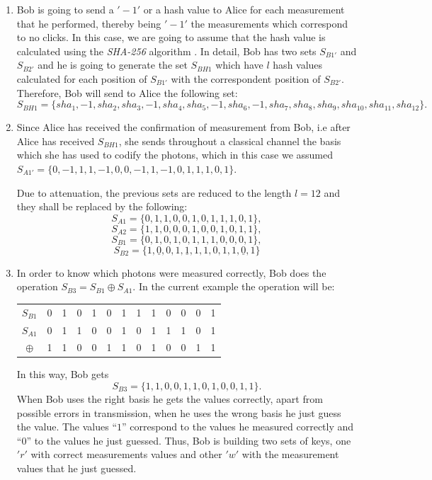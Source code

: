 \begin{enumerate}
  \item Bob is going to send a $'-1'$ or a hash value to Alice for each measurement that he performed, thereby being $'-1'$ the measurements which correspond to no clicks. In this case, we are going to assume that the hash value is calculated using the \textit{SHA-256} algorithm \cite{Liu2009}. In detail, Bob has two sets $S_{B1'}$ and $S_{B2'}$ and he is going to generate the set $S_{BH1}$ which have $l$ hash values calculated for each position of $S_{B1'}$ with the correspondent position of $S_{B2'}$. Therefore, Bob will send to Alice the following set:
      $$S_{BH1}=\{{sha}_{1},-1,{sha}_{2},{sha}_{3}, -1,{sha}_{4},{sha}_{5},-1,{sha}_{6},-1,{sha}_{7},{sha}_{8},{sha}_{9},{sha}_{10},{sha}_{11},{sha}_{12} \}.$$


  \item Since Alice has received the confirmation of measurement from Bob, i.e after Alice has received $S_{BH1}$, she sends throughout a classical channel the basis which she has used to codify the photons, which in this case we assumed $S_{A1'} = \{0,-1,1,1,-1,0,0,-1,1,-1,0,1,1,1,0,1 \}$.

      Due to attenuation, the previous sets are reduced to the length $l=12$ and they shall be replaced by the following:
      $$S_{A1}=\{0,1,1,0,0,1,0,1,1,1,0,1 \},$$
      $$S_{A2}=\{1,1,0,0,0,1,0,0,1,0,1,1 \},$$
      $$S_{B1}=\{0,1,0,1,0,1,1,1,0,0,0,1 \},$$
      $$S_{B2}=\{1,\underline{0},0,1,\underline{1},1,1,0,1,1,\underline{0},1 \}$$

  \item In order to know which photons were measured correctly, Bob does the operation $S_{B3}=S_{B1} \oplus S_{A1}$.
      In the current example the operation will be:

  \begin{table}[H]
    \centering
    \begin{tabular}{c|c c c c c c c c c c c c }
     $S_{B1}$ & 0 & 1 & 0 & 1 & 0 & 1 & 1 & 1 & 0 & 0 & 0 & 1\\
     $S_{A1}$ & 0 & 1 & 1 & 0 & 0 & 1 & 0 & 1 & 1 & 1 & 0 & 1\\ \hline
     $\oplus$ & 1 & 1 & 0 & 0 & 1 & 1 & 0 & 1 & 0 & 0 & 1 & 1
    \end{tabular}
    \end{table}

      In this way, Bob gets $$S_{B3} = \{1,1,0,0,1,1,0,1,0,0,1,1 \}.$$ When Bob uses the right basis he gets the values correctly, apart from possible errors in transmission, when he uses the wrong basis he just guess the value. The values ``$1$'' correspond to the values he measured correctly and ``$0$'' to the values he just guessed.
      Thus, Bob is building two sets of keys, one $'r'$ with correct measurements values and other $'w'$ with the measurement values that he just guessed.


\end{enumerate}
